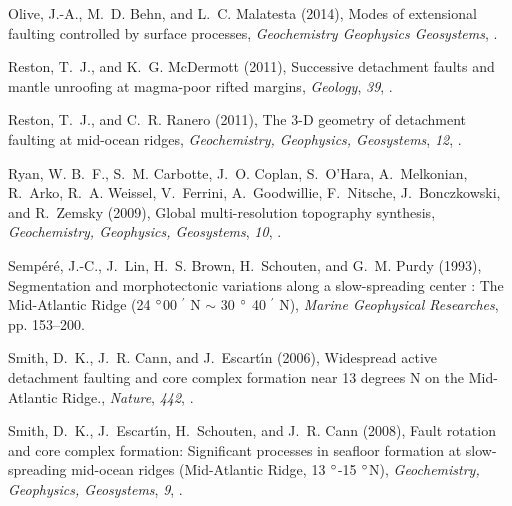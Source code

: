 \documentclass[draft,gc]{agutex}
\begin{document}
\begin{article}
\begin{thebibliography}{39}
Olive, J.-A., M.~D. Behn, and L.~C. Malatesta (2014), {Modes of extensional
  faulting controlled by surface processes}, \textit{Geochemistry Geophysics
  Geosystems}, .

Reston, T.~J., and K.~G. McDermott (2011), {Successive detachment faults and
  mantle unroofing at magma-poor rifted margins}, \textit{Geology},
  \textit{39}, .

Reston, T.~J., and C.~R. Ranero (2011), {The 3-D geometry of detachment
  faulting at mid-ocean ridges}, \textit{Geochemistry, Geophysics, Geosystems},
  \textit{12}, .

Ryan, W. B.~F., S.~M. Carbotte, J.~O. Coplan, S.~O'Hara, A.~Melkonian, R.~Arko,
  R.~A. Weissel, V.~Ferrini, A.~Goodwillie, F.~Nitsche, J.~Bonczkowski, and
  R.~Zemsky (2009), {Global multi-resolution topography synthesis},
  \textit{Geochemistry, Geophysics, Geosystems}, \textit{10},
  .

Semp\'{e}r\'{e}, J.-C., J.~Lin, H.~S. Brown, H.~Schouten, and G.~M. Purdy
  (1993), {Segmentation and morphotectonic variations along a slow-spreading
  center : The Mid-Atlantic Ridge (24 $\degree$00 $^{\prime}$ N $\sim$ 30
  $\degree$ 40 $^{\prime}$ N)}, \textit{Marine Geophysical Researches}, pp.
  153--200.

Smith, D.~K., J.~R. Cann, and J.~Escart\'{\i}n (2006), {Widespread active
  detachment faulting and core complex formation near 13 degrees N on the
  Mid-Atlantic Ridge.}, \textit{Nature}, \textit{442},
  .

Smith, D.~K., J.~Escart\'{\i}n, H.~Schouten, and J.~R. Cann (2008), {Fault
  rotation and core complex formation: Significant processes in seafloor
  formation at slow-spreading mid-ocean ridges (Mid-Atlantic Ridge, 13
  $\degree$-15 $\degree$N)}, \textit{Geochemistry, Geophysics, Geosystems},
  \textit{9}, .


\end{thebibliography}
\end{article}
\end{document}
